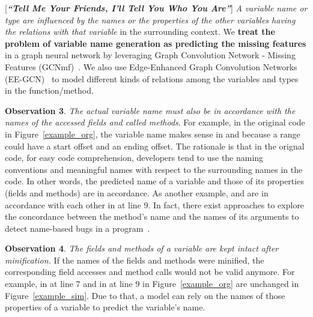 \vspace{2pt}
 [{\bf {\em ``Tell Me Your Friends, I'll Tell
    You Who You Are''}}]
          {\em A variable name or type are influenced by the
  names or the properties of the other variables having the relations
  with that variable} in the surrounding context. We {\bf treat the
  problem of variable name generation as predicting the missing
  features} in a graph neural network by leveraging Graph Convolution
Network - Missing Features (GCNmf)~\cite{GCNmf}.  We also use
Edge-Enhanced Graph Convolution Networks (EE-GCN)~\cite{ee-gcn} to
model different kinds of relations among the
variables and types in the function/method.



\vspace{2pt} \textbf{Observation 3}. {\em The actual variable name
  must also be in accordance with the names of the accessed fields and
  called methods}. For example, in the original code in
Figure~\ref{example_org}, the variable name  makes sense
in  and  because a range
could have a start offset and an ending offset. The rationale is that
in the orignal code, for easy code comprehension, developers tend to
use the naming conventions and meaningful names with respect to the
surrounding names in the code. In other words, the predicted name of a
variable and those of its properties (fields and methods) are in
accordance. As another example,  and
 are in accordance with each other in
 at line 9. In fact, there exist
approaches to explore the concordance between the method's name and
the names of its arguments to detect name-based bugs in a
program~\cite{deepbugs-oopsla18}.

\vspace{2pt}
\textbf{Observation 4}. {\em The fields and methods of a variable are
  kept intact after minification.} If the names of the fields and
methods were minified, the corresponding field accesses and method
calls would not be valid anymore. For example,  in
 at line 7 and  in
 at line 9 in Figure~\ref{example_org} are
unchanged in Figure~\ref{example_sim}. Due to that, a model can rely
on the names of those properties of a variable to predict the
variable's name.

